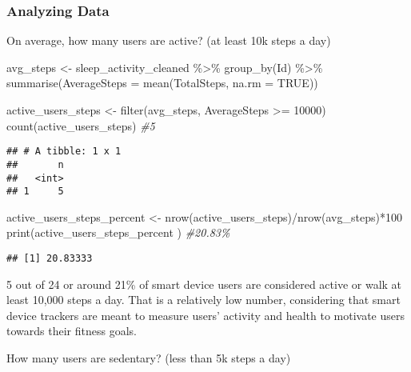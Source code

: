 \documentclass[
]{article}
\newenvironment{Shaded}{\begin{snugshade}}{\end{snugshade}}
\newcommand{\AttributeTok}[1]{\textcolor[rgb]{0.77,0.63,0.00}{#1}}
\newcommand{\CommentTok}[1]{\textcolor[rgb]{0.56,0.35,0.01}{\textit{#1}}}
\newcommand{\ConstantTok}[1]{\textcolor[rgb]{0.00,0.00,0.00}{#1}}
\newcommand{\DecValTok}[1]{\textcolor[rgb]{0.00,0.00,0.81}{#1}}
\newcommand{\FunctionTok}[1]{\textcolor[rgb]{0.00,0.00,0.00}{#1}}
\newcommand{\NormalTok}[1]{#1}
\newcommand{\OtherTok}[1]{\textcolor[rgb]{0.56,0.35,0.01}{#1}}
\newcommand{\SpecialCharTok}[1]{\textcolor[rgb]{0.00,0.00,0.00}{#1}}
\begin{document}
\hypertarget{analyzing-data}{%
\subsubsection{Analyzing Data}\label{analyzing-data}}

On average, how many users are active? (at least 10k steps a day)

\begin{Shaded}
\begin{Highlighting}[]
\NormalTok{avg\_steps }\OtherTok{\textless{}{-}}\NormalTok{ sleep\_activity\_cleaned }\SpecialCharTok{\%\textgreater{}\%} 
  \FunctionTok{group\_by}\NormalTok{(Id) }\SpecialCharTok{\%\textgreater{}\%} 
  \FunctionTok{summarise}\NormalTok{(}\AttributeTok{AverageSteps =} \FunctionTok{mean}\NormalTok{(TotalSteps, }\AttributeTok{na.rm =} \ConstantTok{TRUE}\NormalTok{))}

\NormalTok{active\_users\_steps }\OtherTok{\textless{}{-}} \FunctionTok{filter}\NormalTok{(avg\_steps, AverageSteps }\SpecialCharTok{\textgreater{}=} \DecValTok{10000}\NormalTok{)}
\FunctionTok{count}\NormalTok{(active\_users\_steps) }\CommentTok{\#5}
\end{Highlighting}
\end{Shaded}

\begin{verbatim}
## # A tibble: 1 x 1
##       n
##   <int>
## 1     5
\end{verbatim}

\begin{Shaded}
\begin{Highlighting}[]
\NormalTok{active\_users\_steps\_percent }\OtherTok{\textless{}{-}} \FunctionTok{nrow}\NormalTok{(active\_users\_steps)}\SpecialCharTok{/}\FunctionTok{nrow}\NormalTok{(avg\_steps)}\SpecialCharTok{*}\DecValTok{100}
\FunctionTok{print}\NormalTok{(active\_users\_steps\_percent ) }\CommentTok{\#20.83\%}
\end{Highlighting}
\end{Shaded}

\begin{verbatim}
## [1] 20.83333
\end{verbatim}

5 out of 24 or around 21\% of smart device users are considered active
or walk at least 10,000 steps a day. That is a relatively low number,
considering that smart device trackers are meant to measure users'
activity and health to motivate users towards their fitness goals.

How many users are sedentary? (less than 5k steps a day)
\end{document}
